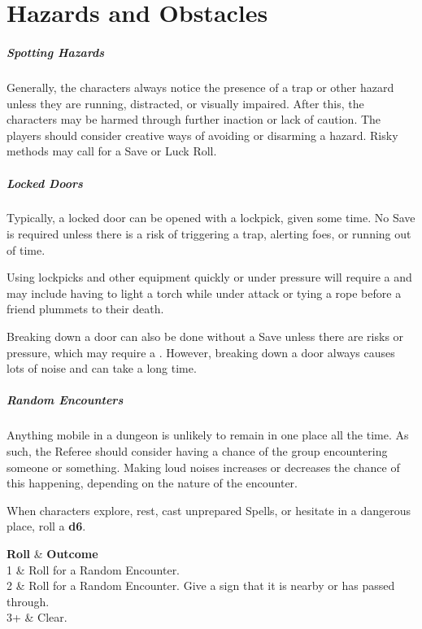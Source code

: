 \documentclass[itdr/core]{subfiles}
\begin{document}
\chapter{Hazards and Obstacles}
\label{ch:hazards_and_obstacles}

\paragraph{Spotting Hazards}
Generally, the characters always notice the presence of a trap or other hazard unless they are running, distracted, or visually impaired. After this, the characters may be harmed through further inaction or lack of caution. The players should consider creative ways of avoiding or disarming a hazard. Risky methods may call for a Save or Luck Roll.

\paragraph{Locked Doors}
Typically, a locked door can be opened with a lockpick, given some time. No Save is required unless there is a risk of triggering a trap, alerting foes, or running out of time.

Using lockpicks and other equipment quickly or under pressure will require a  and may include having to light a torch while under attack or tying a rope before a friend plummets to their death.

Breaking down a door can also be done without a Save unless there are risks or pressure, which may require a . However, breaking down a door always causes lots of noise and can take a long time.

\paragraph{Random Encounters}
Anything mobile in a dungeon is unlikely to remain in one place all the time. As such, the Referee should consider having a chance of the group encountering someone or something. Making loud noises increases or decreases the chance of this happening, depending on the nature of the encounter.

When characters explore, rest, cast unprepared Spells, or hesitate in a dangerous place, roll a \textbf{d6}.

\begin{dtable}[cL]
	\textbf{Roll} & \textbf{Outcome} \\
	1	& Roll for a Random Encounter.\\
	2	& Roll for a Random Encounter. Give a sign that it is nearby or has passed through.\\
	3+	& Clear.\\
\end{dtable}
\end{document}
